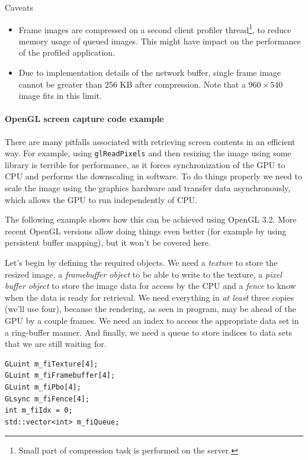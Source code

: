 \documentclass[hidelinks,titlepage,a4paper]{article}
\begin{document}
\begin{bclogo}[
noborder=true,
couleur=black!5,
logo=\bcattention
]{Caveats}
\begin{itemize}
\item Frame images are compressed on a second client profiler thread\footnote{Small part of compression task is performed on the server.}, to reduce memory usage of queued images. This might have impact on the performance of the profiled application.
\item Due to implementation details of the network buffer, single frame image cannot be greater than 256 KB after compression. Note that a $960\times540$ image fits in this limit.
\end{itemize}
\end{bclogo}

\paragraph{OpenGL screen capture code example}
\label{screenshotcode}

There are many pitfalls associated with retrieving screen contents in an efficient way. For example, using \texttt{glReadPixels} and then resizing the image using some library is terrible for performance, as it forces synchronization of the GPU to CPU and performs the downscaling in software. To do things properly we need to scale the image using the graphics hardware and transfer data asynchronously, which allows the GPU to run independently of CPU.

The following example shows how this can be achieved using OpenGL 3.2. More recent OpenGL versions allow doing things even better (for example by using persistent buffer mapping), but it won't be covered here.

Let's begin by defining the required objects. We need a \emph{texture} to store the resized image, a \emph{framebuffer object} to be able to write to the texture, a \emph{pixel buffer object} to store the image data for access by the CPU and a \emph{fence} to know when the data is ready for retrieval. We need everything in \emph{at least} three copies (we'll use four), because the rendering, as seen in program, may be ahead of the GPU by a couple frames. We need an index to access the appropriate data set in a ring-buffer manner. And finally, we need a queue to store indices to data sets that we are still waiting for.

\begin{lstlisting}
GLuint m_fiTexture[4];
GLuint m_fiFramebuffer[4];
GLuint m_fiPbo[4];
GLsync m_fiFence[4];
int m_fiIdx = 0;
std::vector<int> m_fiQueue;
\end{lstlisting}
\end{document}
